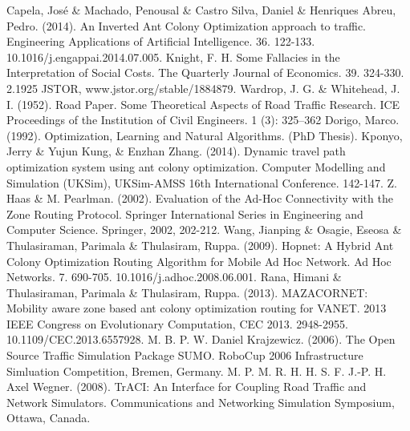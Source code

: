 \documentclass[conference]{IEEEtran}
\begin{document}
\begin{thebibliography}{1}
 Capela, José \& Machado, Penousal \& Castro Silva, Daniel \& Henriques Abreu, Pedro. (2014). An Inverted Ant Colony Optimization approach to traffic. Engineering Applications of Artificial Intelligence. 36. 122-133. 10.1016/j.engappai.2014.07.005. 
 Knight, F. H. Some Fallacies in the Interpretation of Social Costs. The Quarterly Journal of Economics. 39. 324-330. 2.1925 JSTOR, www.jstor.org/stable/1884879.
 Wardrop, J. G. \& Whitehead, J. I. (1952). Road Paper. Some Theoretical Aspects of Road Traffic Research. ICE Proceedings of the Institution of Civil Engineers. 1 (3): 325–362
 Dorigo, Marco. (1992). Optimization, Learning and Natural Algorithms. (PhD Thesis).
 Kponyo, Jerry \& Yujun Kung, \& Enzhan Zhang. (2014). Dynamic travel path optimization system using ant colony optimization. Computer Modelling and Simulation (UKSim), UKSim-AMSS 16th International Conference. 142-147.
 Z. Haas \& M. Pearlman. (2002). Evaluation of the Ad-Hoc Connectivity with the Zone Routing Protocol. Springer International Series in Engineering and Computer Science. Springer, 2002, 202-212.
 Wang, Jianping \& Osagie, Eseosa \& Thulasiraman, Parimala \& Thulasiram, Ruppa. (2009). Hopnet: A Hybrid Ant Colony Optimization Routing Algorithm for Mobile Ad Hoc Network. Ad Hoc Networks. 7. 690-705. 10.1016/j.adhoc.2008.06.001. 
 Rana, Himani \& Thulasiraman, Parimala \& Thulasiram, Ruppa. (2013). MAZACORNET: Mobility aware zone based ant colony optimization routing for VANET. 2013 IEEE Congress on Evolutionary Computation, CEC 2013. 2948-2955. 10.1109/CEC.2013.6557928. 
 M. B. P. W. Daniel Krajzewicz. (2006). The Open Source Traffic Simulation Package SUMO. RoboCup 2006 Infrastructure Simluation Competition, Bremen, Germany. 
 M. P. M. R. H. H. S. F. J.-P. H. Axel Wegner. (2008). TrACI: An Interface for Coupling Road Traffic and Network Simulators. Communications and Networking Simulation Symposium, Ottawa, Canada. 
\end{thebibliography}
\end{document}
